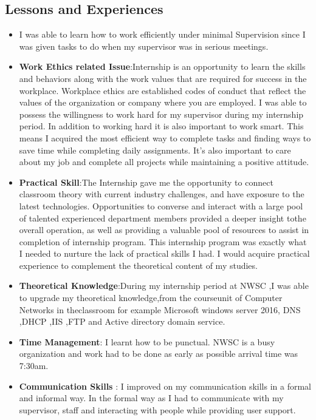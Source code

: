 \documentclass{article}
\begin{document}
\subsection{Lessons and Experiences}
\begin{itemize}
\item I was able to learn how to work efficiently under minimal Supervision since I was given tasks to do when my supervisor was in serious meetings.
  \item \textbf{Work Ethics related Issue}:Internship is an opportunity to learn the skills and behaviors along with the work values that are required for success in the workplace. Workplace ethics are established codes of conduct that reflect the values of the organization or company where you are employed. I was able to possess the willingness to work hard for my supervisor during my internship period. In addition to working hard it is also important to work smart. This means I acquired the most efficient way to complete tasks and finding ways to save time while completing daily assignments. It’s also important to care about my job and complete all projects while maintaining a positive attitude.
\item \textbf{Practical Skill}:The Internship gave me  the opportunity to connect classroom theory with current industry challenges, and have exposure to the latest technologies. Opportunities to converse and interact with a large pool of talented experienced department members  provided a deeper insight tothe overall operation, as well as providing a valuable pool of resources to assist in completion of internship program. This internship program was exactly what I needed to nurture the lack of practical skills I had. I would acquire practical experience to complement the theoretical content of my studies.
\item \textbf{Theoretical Knowledge}:During my internship period at NWSC ,I was able to  upgrade my theoretical knowledge,from the courseunit  of  Computer Networks in theclassroom for example Microsoft windows server 2016, DNS ,DHCP ,IIS ,FTP and Active directory domain service.
  \item \textbf{Time Management}:  I learnt how to be punctual. NWSC is a busy organization and work had to be done as early as possible arrival time was 7:30am.
\item \textbf{Communication Skills} : I improved on my  communication skills in a formal and informal way. In the formal way as I had to communicate with my supervisor, staff and interacting with people while providing user support.

\end{itemize}
\end{document}
